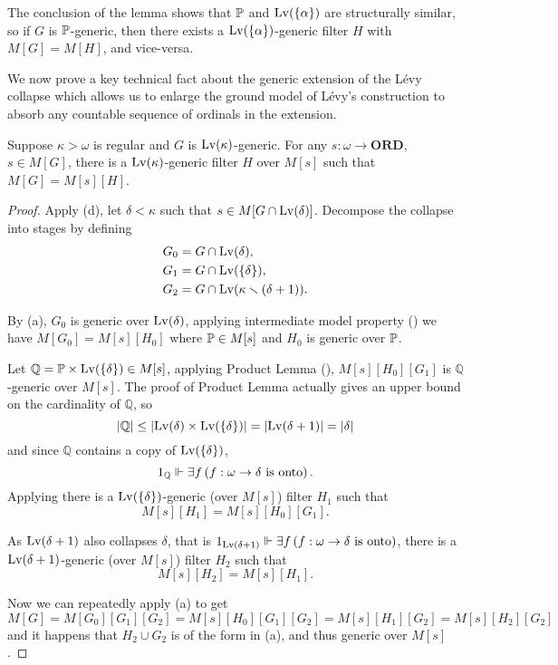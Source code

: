 \begin{remark}
    The conclusion of the lemma shows that \(\P\) and \(\Lv(\set{\alpha})\) are structurally similar,
    so if \(G\) is \(\P\)-generic, then there exists a \(\Lv(\set{\alpha})\)-generic filter \(H\) with \(M[G] = M[H]\),
    and vice-versa.
\end{remark}


\newcommand*{\Q}{{\mathbb{Q}}}
We now prove a key technical fact about the generic extension of the Lévy collapse
which allows us to enlarge the ground model of Lévy's construction to absorb any countable sequence of ordinals in the extension.
\begin{lemma} \label{lemma:important}
    Suppose \(\kappa>\omega\) is regular and \(G\) is \(\Lv(\kappa)\)-generic.
    For any \(s:\omega\to\mathbf{ORD}\), \(s\in M[G]\),
    there is a \(\Lv(\kappa)\)-generic filter \(H\) over \(M[s]\)
    such that \(M[G] = M[s][H]\).
\end{lemma}
\begin{proof}
    Apply  (d), let \(\delta<\kappa\) such that \(s \in M[G\cap\Lv(\delta)]\).
    Decompose the collapse into stages by defining
    \begin{align*}
        G_0 &= G\cap\Lv(\delta), \\
        G_1 &= G\cap\Lv(\set{\delta}), \\
        G_2 &= G\cap\Lv(\kappa\setminus(\delta+1)).
    \end{align*}

    By  (a), \(G_0\) is generic over \(\Lv(\delta)\),
    applying intermediate model property ()
    we have \(M[G_0] = M[s][H_0]\) where \(\P\in M[s]\) and \(H_0\) is generic over \(\P\).

    Let \(\Q = \P\times\Lv(\set{\delta}) \in M[s]\),
    applying Product Lemma (), \(M[s][H_0][G_1]\) is \(\Q\)-generic over \(M[s]\).
    The proof of Product Lemma actually gives an upper bound on the cardinality of \(\Q\), so
    \[ \abs{\Q} \leq \abs{\Lv(\delta)\times\Lv(\set{\delta})} = \abs{\Lv(\delta+1)} = \abs{\delta} \]
    and since \(\Q\) contains a copy of \(\Lv(\set{\delta})\),
    \[ 1_\Q \forces \exists f\paren{f:\omega\to\delta \text{ is onto}}. \]
    Applying 
    there is a \(\Lv(\set{\delta})\)-generic (over \(M[s]\)) filter \(H_1\) such that \[ M[s][H_1] = M[s][H_0][G_1].\]

    As \(\Lv(\delta+1)\) also collapses \(\delta\), that is \( 1_{\Lv(\delta+1)} \forces \exists f\paren{f:\omega\to\delta \text{ is onto}} \),
    there is a \(\Lv(\delta+1)\)-generic (over \(M[s]\)) filter \(H_2\) such that \[ M[s][H_2] = M[s][H_1]. \]

    Now we can repeatedly apply  (a) to get
    \[ M[G] = M[G_0][G_1][G_2] = M[s][H_0][G_1][G_2] = M[s][H_1][G_2] = M[s][H_2][G_2] \]
    and it happens that \(H_2 \cup G_2\) is of the form in  (a), and thus generic over \(M[s]\).
\end{proof}




